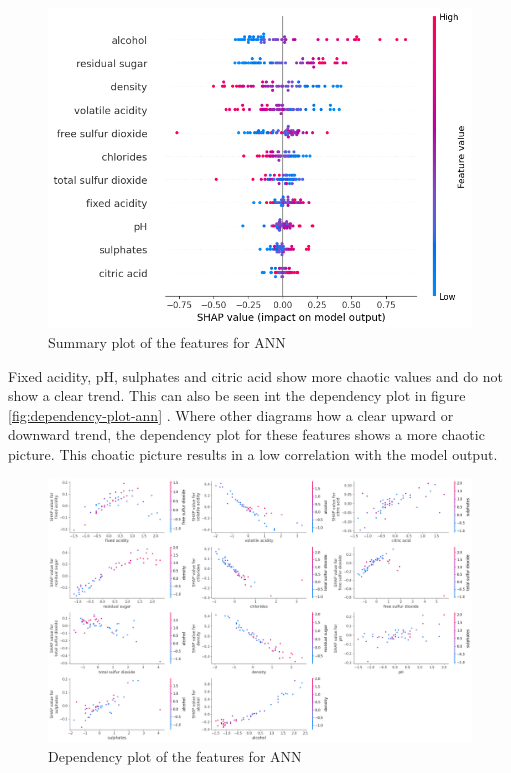\documentclass{article}
\begin{document}
\begin{figure}
	\centering
	\includegraphics[width=\linewidth]{figures/shap-summary-ann.png}
	\caption{Summary plot of the features for ANN}
	\label{fig:summary-plot-ann}
\end{figure}

Fixed acidity, pH, sulphates and citric acid show more chaotic values and do not show a clear trend.
This can also be seen int the dependency plot in figure \autoref{fig:dependency-plot-ann} .
Where other diagrams how a clear upward or downward trend, the dependency plot for these features shows a more chaotic picture.
This choatic picture results in a low correlation with the model output.

\begin{figure}
	\centering
	\includegraphics[width=\linewidth]{figures/shap_dependency_ann.png}
	\caption{Dependency plot of the features for ANN}
	\label{fig:dependency-plot-ann}
\end{figure}
\end{document}
